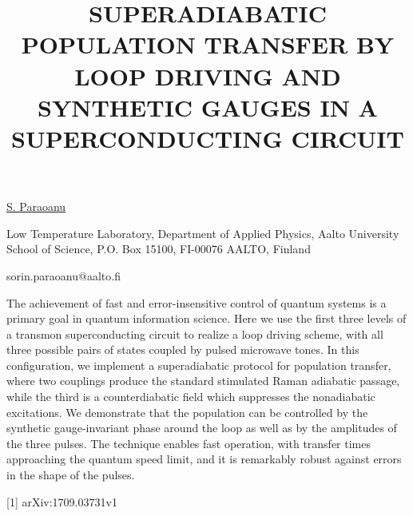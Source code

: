\title{SUPERADIABATIC POPULATION TRANSFER BY LOOP DRIVING AND SYNTHETIC GAUGES IN A SUPERCONDUCTING CIRCUIT}

\underline{S. Paraoanu} 

{\normalsize{\vspace{-4mm}
Low Temperature Laboratory, Department of Applied Physics,
Aalto University School of Science,
P.O. Box 15100, FI-00076 AALTO, Finland

\email sorin.paraoanu@aalto.fi}}

The achievement of fast and error-insensitive control of quantum systems is a primary  goal  in  quantum  information  science.   Here  we  use  the  first  three  levels  of  a transmon  superconducting  circuit  to  realize  a  loop  driving  scheme,  with  all  three possible  pairs  of  states  coupled  by  pulsed  microwave  tones.   In  this  configuration, we implement a superadiabatic protocol for population transfer, where two couplings produce the standard stimulated Raman adiabatic passage, while the third is a counterdiabatic field which suppresses the nonadiabatic excitations.  We demonstrate that the population can be controlled by the synthetic gauge-invariant phase around the loop as well as by the amplitudes of the three pulses.  The technique enables fast operation, with transfer times approaching the quantum speed limit, and it is remarkably robust against errors in the shape of the pulses.

{\normalsize
[1] arXiv:1709.03731v1
}


\vspace{\baselineskip}
